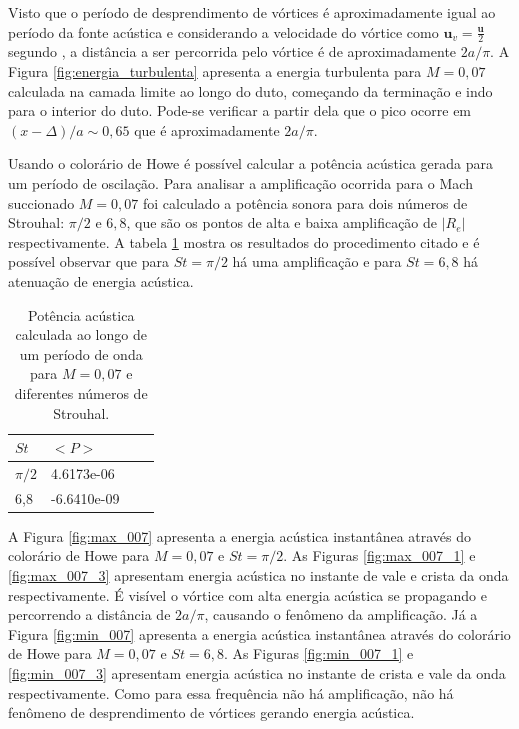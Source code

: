 \begin{figure}[ht!]
\centering
  
\end{figure}

Visto que o período de desprendimento de vórtices é aproximadamente igual ao período da fonte acústica e considerando a velocidade do vórtice como $\textbf{u}_{v} = \frac{\textbf{u}}{2}$ segundo , a distância a ser percorrida pelo vórtice é de aproximadamente $2a/\pi$. A Figura \ref{fig:energia_turbulenta} apresenta a energia turbulenta para $M = 0,07$ calculada na camada limite ao longo do duto, começando da terminação e indo para o interior do duto. Pode-se verificar a partir dela que o pico ocorre em $(x - \Delta)/a \sim 0,65$ que é aproximadamente $2a/\pi$.

\newpage
\begin{figure}[ht!]
\centering
  
\end{figure}

Usando o colorário de Howe é possível calcular a potência acústica gerada para um período de oscilação. Para analisar a amplificação ocorrida para o Mach succionado $M = 0,07$ foi calculado a potência sonora para dois números de Strouhal: $\pi/2$ e $6,8$, que são os pontos de alta e baixa amplificação de $|R_{e}|$ respectivamente. A tabela \ref{table:potencia} mostra os resultados do procedimento citado e é possível observar que para $St = \pi/2$ há uma amplificação e para $St = 6,8$ há atenuação de energia acústica. 

\begin{table}[ht!]
\centering
\caption{Potência acústica calculada ao longo de um período de onda para $M = 0,07$ e diferentes números de Strouhal.}
\label{table:potencia}
    \begin{tabular}{|l|l|l|l|}
        \hline
        $St$ & $<P>$ \\ \hline
        $\pi/2$ & 4.6173e-06  \\ \hline  
        6,8 & -6.6410e-09 \\ \hline
    \end{tabular}
\end{table} 


A Figura \ref{fig:max_007} apresenta a energia acústica instantânea através do colorário de Howe para $M = 0,07$ e $St = \pi/2$.  
As Figuras \ref{fig:max_007_1} e \ref{fig:max_007_3} apresentam energia acústica no instante de vale e crista da onda respectivamente. É visível o vórtice com alta energia acústica se propagando e percorrendo a distância de $2a/\pi$, causando o fenômeno da amplificação. Já a Figura \ref{fig:min_007} apresenta a energia acústica instantânea através do colorário de Howe para $M = 0,07$ e $St = 6,8$. As Figuras \ref{fig:min_007_1} e \ref{fig:min_007_3} apresentam energia acústica no instante de crista e vale da onda respectivamente. Como para essa frequência não há amplificação, não há fenômeno de desprendimento de vórtices gerando energia acústica.   

